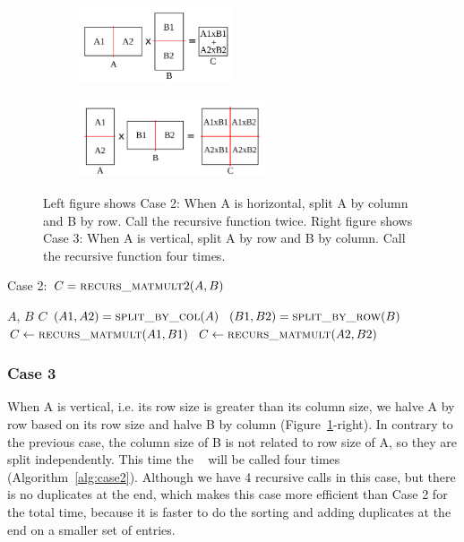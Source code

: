 \begin{figure}[tbh]
    \centering
    \begin{subfigure}{.45\textwidth}
        \centering
        \includegraphics[width=4.5cm,height=2.3cm]{./figures/case2_001.pdf}
    \end{subfigure}
    \begin{subfigure}{.45\textwidth}
        \centering
        \includegraphics[width=5.5cm,height=2.3cm]{./figures/case3_001.pdf}
    \end{subfigure}
    \caption{Left figure shows Case 2: When A is horizontal, split A by column and B by row. Call the recursive function twice. Right figure shows Case 3: When A is vertical, split A by row and B by column. Call the recursive function four times.}
    \label{fig:case2}
\end{figure}

\begin{algorithm}[tbh] 
  \caption{Case 2: $C = \textsc{recurs\_matmult}2(A, B)$} \label{alg:case2} 
  \begin{algorithmic}[1]
    \Require $A$, $B$
    \Ensure  $C$
    \State $(A1, A2) = \textsc{split\_by\_col}(A)$
    \State $(B1, B2) = \textsc{split\_by\_row}(B)$
    \State $C \leftarrow \textsc{recurs\_matmult}(A1,B1)$
    \State $C \leftarrow \textsc{recurs\_matmult}(A2,B2)$
  \end{algorithmic}
\end{algorithm}

\subsubsection{Case 3}
\label{sec:case3}
When A is vertical, i.e. its row size is greater than its column size, we halve A by row based on its row size and halve B by column (Figure~\ref{fig:case2}-right). In contrary to the previous case, the column size of B is not related to row size of A, so they are split independently. This time the \recmm~ will be called four times (Algorithm~\ref{alg:case2}).  Although we have 4 recursive calls in this case, but there is no duplicates at the end, which makes this case more efficient than Case 2 for the total time, because it is faster to do the sorting and adding duplicates at the end on a smaller set of entries. 

